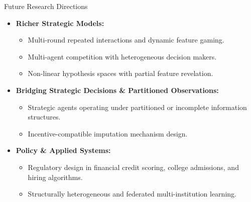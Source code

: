 \documentclass[aspectratio=169, 11pt, t, xcolor=table]{beamer}
\begin{document}
\begin{frame}{Future Research Directions}
\small
\begin{itemize}
  \item \textbf{Richer Strategic Models:}
  \begin{itemize}
    \item Multi-round repeated interactions and dynamic feature gaming.
    \item Multi-agent competition with heterogeneous decision makers.
    \item Non-linear hypothesis spaces with partial feature revelation.
  \end{itemize}

  \vspace{0.2em}
  \item \textbf{Bridging Strategic Decisions \& Partitioned Observations:}
  \begin{itemize}
    \item Strategic agents operating under partitioned or incomplete information structures.
    \item Incentive-compatible imputation mechanism design.
  \end{itemize}

  \vspace{0.2em}
  \item \textbf{Policy \& Applied Systems:}
  \begin{itemize}
    \item Regulatory design in financial credit scoring, college admissions, and hiring algorithms.
    \item Structurally heterogeneous and federated multi-institution learning.
  \end{itemize}
\end{itemize}
\end{frame}
\end{document}
